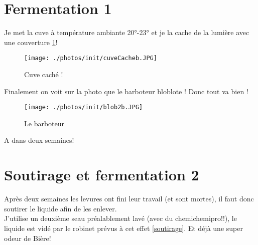 \documentclass[twoside,twocolumn]{report}
\begin{document}
		\section{Fermentation 1}
			Je met la cuve à température ambiante 20°-23° et je la cache de la lumière avec une couverture  \ref{cuvec}!\\
			\begin{figure}[h!]
				\centering
				\texttt{[image: ./photos/init/cuveCacheb.JPG]}
				\caption{Cuve caché !}
				\label{cuvec}
			\end{figure}
			Finalement on voit sur la photo que le barboteur bloblote ! Donc tout va bien !
			 \begin{figure}[h!]
			 	\centering
			 	\texttt{[image: ./photos/init/blob2b.JPG]}
			 	\caption{Le barboteur}
			 	\label{blob}
			 \end{figure}
			A dans deux semaines!
				 
		\section{Soutirage et fermentation 2}		 
		Après deux semaines les levures ont fini leur travail (et sont mortes), il faut donc soutirer le liquide afin de les enlever.\\
		J'utilise un deuxième seau préalablement lavé (avec du chemichemipro!!), le liquide est vidé par le robinet prévus à cet effet \ref{soutirage}. Et déjà une super odeur de Bière! \\
		
\end{document}
